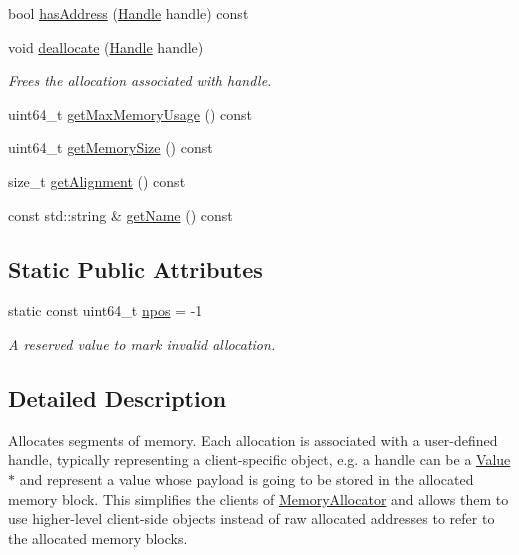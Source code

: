 \begin{DoxyCompactItemize}
\item 
bool \hyperlink{classglow_1_1_memory_allocator_ab16a406e4055fc4ceb6ad9b006cefc5d}{has\+Address} (\hyperlink{classglow_1_1_memory_allocator_a8ebc21e1c9250f73f2e85aca3ae4ae9d}{Handle} handle) const
\item 
\mbox{\label{classglow_1_1_memory_allocator_ab06ac4c835acd5fd4bbb934794242fab}} 
void \hyperlink{classglow_1_1_memory_allocator_ab06ac4c835acd5fd4bbb934794242fab}{deallocate} (\hyperlink{classglow_1_1_memory_allocator_a8ebc21e1c9250f73f2e85aca3ae4ae9d}{Handle} handle)
\begin{DoxyCompactList}\small\item\em Frees the allocation associated with {\ttfamily handle}. \end{DoxyCompactList}\item 
uint64\+\_\+t \hyperlink{classglow_1_1_memory_allocator_a0eb46056b93ae87117ead760dd1cbff6}{get\+Max\+Memory\+Usage} () const
\item 
uint64\+\_\+t \hyperlink{classglow_1_1_memory_allocator_a8d2b8991817b453831e7aadd67d139ea}{get\+Memory\+Size} () const
\item 
size\+\_\+t \hyperlink{classglow_1_1_memory_allocator_a6ca88b0c91e251a8c4fb320b768ef065}{get\+Alignment} () const
\item 
const std\+::string \& \hyperlink{classglow_1_1_memory_allocator_a7c51c4cd7710dd6b827034211db38e17}{get\+Name} () const
\end{DoxyCompactItemize}
\subsection*{Static Public Attributes}
\begin{DoxyCompactItemize}
\item 
static const uint64\+\_\+t \hyperlink{classglow_1_1_memory_allocator_a41dc4f17fc3b4e242406d9d4a9b419d5}{npos} = -\/1
\begin{DoxyCompactList}\small\item\em A reserved value to mark invalid allocation. \end{DoxyCompactList}\end{DoxyCompactItemize}


\subsection{Detailed Description}
Allocates segments of memory. Each allocation is associated with a user-\/defined handle, typically representing a client-\/specific object, e.\+g. a handle can be a {\ttfamily \hyperlink{classglow_1_1_value}{Value} $\ast$} and represent a value whose payload is going to be stored in the allocated memory block. This simplifies the clients of \hyperlink{classglow_1_1_memory_allocator}{Memory\+Allocator} and allows them to use higher-\/level client-\/side objects instead of raw allocated addresses to refer to the allocated memory blocks. 

